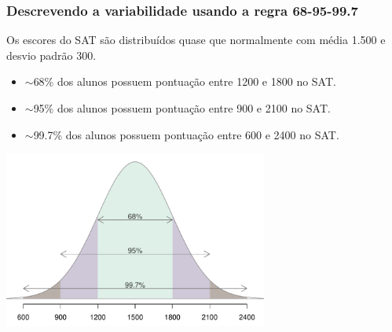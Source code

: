 \begin{frame}
\frametitle{Descrevendo a variabilidade usando a regra 68-95-99.7}
\justifying
Os escores do SAT são distribuídos quase que normalmente com média 1.500 e desvio padrão 300.

\pause
\begin{itemize}
\justifying
\footnotesize
\item $\sim$68\% dos alunos possuem pontuação entre 1200 e 1800 no SAT.
\justifying
\item $\sim$95\% dos alunos possuem pontuação entre 900 e 2100 no SAT. 
\justifying
\item $\sim$99.7\% dos alunos possuem pontuação entre 600 e 2400 no SAT. 

\end{itemize}

\begin{center}
\includegraphics[width=0.65\textwidth]{3-1_normal_distribution/sat_empirical.pdf}
\end{center}

\end{frame}


